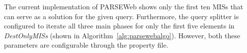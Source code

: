The current implementation of PARSEWeb shows only the first ten MISs
that can serve as a solution for the given query. Furthermore, the
query splitter is configured to iterate all three main phases
for only the first five elements in \emph{DestOnlyMISs} (shown in
Algorithm~\ref{alg:parsewebalgo}). However, both these parameters are
configurable through the property file.

